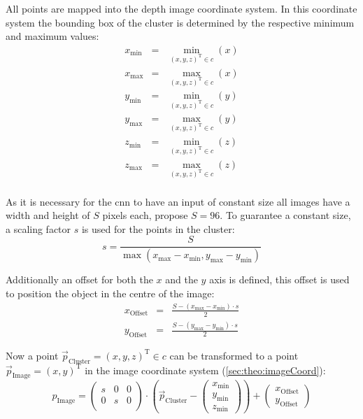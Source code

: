 All points are mapped into the depth image coordinate system. In this coordinate system the bounding box of the cluster is determined by the respective minimum and maximum values:
\begin{eqnarray}
    x_\text{min} &=& \min_{{(x,y,z)}^\text{T} \in c}(x) \label{eqn:det:minx} \\ 
    x_\text{max} &=& \max_{{(x,y,z)}^\text{T} \in c}(x) \\
    y_\text{min} &=& \min_{{(x,y,z)}^\text{T} \in c}(y) \\
    y_\text{max} &=& \max_{{(x,y,z)}^\text{T} \in c}(y) \label{eqn:det:maxy} \\
    z_\text{min} &=& \min_{{(x,y,z)}^\text{T} \in c}(z) \label{eqn:det:minz} \\
    z_\text{max} &=& \max_{{(x,y,z)}^\text{T} \in c}(z) \label{eqn:det:maxz} \\
\end{eqnarray}

As it is necessary for the \ac{cnn} to have an input of constant size all images have a width and height of $S$ pixels each, \cite{AttBen17} propose $S=96$. To guarantee a constant size, a scaling factor $s$ is used for the points in the cluster:
\begin{equation}
    s = \frac{S}{\max(x_\text{max} - x_\text{min}, y_\text{max} - y_\text{min})}
\end{equation}

Additionally an offset for both the $x$ and the $y$ axis is defined, this offset is used to position the object in the centre of the image:
\begin{eqnarray}
    x_\text{Offset} &=& \frac{S - (x_\text{max} - x_\text{min}) \cdot s}{2} \\
    y_\text{Offset} &=& \frac{S - (y_\text{max} - y_\text{min}) \cdot s}{2}
\end{eqnarray}

Now a point $\vec{p}_\text{Cluster} = {(x,y,z)}^\text{T} \in c$ can be transformed to a point $\vec{p}_\text{Image} = {(x,y)}^\text{T}$ in the image coordinate system (\ref{sec:theo:imageCoord}):
\begin{equation} \label{eq:det:trans}
    p_\text{Image} = 
    \begin{pmatrix}
        s & 0 & 0\\
        0 & s & 0\\
    \end{pmatrix} 
    \cdot \left(\vec{p}_\text{Cluster} - 
    \begin{pmatrix} 
        x_\text{min} \\ y_\text{min} \\ z_\text{min} 
    \end{pmatrix} 
    \right) + 
    \begin{pmatrix} 
        x_\text{Offset} \\ y_\text{Offset} 
    \end{pmatrix}
\end{equation}

